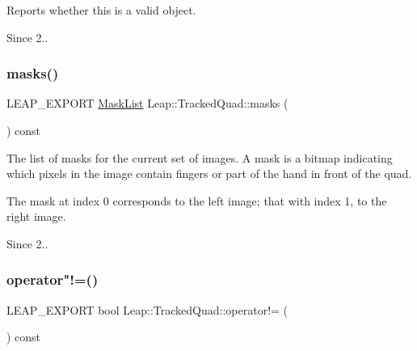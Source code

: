 Reports whether this is a valid object. 
\begin{DoxyCodeInclude}
\end{DoxyCodeInclude}
 \begin{DoxySince}{Since}
2.. 
\end{DoxySince}
\mbox{\label{class_leap_1_1_tracked_quad_a36aa583b32b798ffd94c1a11c3f00d40}} 
\subsubsection{\texorpdfstring{masks()}{masks()}}
{\footnotesize\ttfamily L\+E\+A\+P\+\_\+\+E\+X\+P\+O\+RT \hyperlink{class_leap_1_1_mask_list}{Mask\+List} Leap\+::\+Tracked\+Quad\+::masks (\begin{DoxyParamCaption}{ }\end{DoxyParamCaption}) const}

The list of masks for the current set of images. A mask is a bitmap indicating which pixels in the image contain fingers or part of the hand in front of the quad.

The mask at index 0 corresponds to the left image; that with index 1, to the right image. 
\begin{DoxyCodeInclude}
\end{DoxyCodeInclude}
 \begin{DoxySince}{Since}
2.. 
\end{DoxySince}
\mbox{\label{class_leap_1_1_tracked_quad_aff1ee3d987b9f4d0fe099339fbf889bb}} 
\subsubsection{\texorpdfstring{operator"!=()}{operator!=()}}
{\footnotesize\ttfamily L\+E\+A\+P\+\_\+\+E\+X\+P\+O\+RT bool Leap\+::\+Tracked\+Quad\+::operator!= (\begin{DoxyParamCaption}\item[{const \hyperlink{class_leap_1_1_tracked_quad}{Tracked\+Quad} \&}]{ }\end{DoxyParamCaption}) const}

